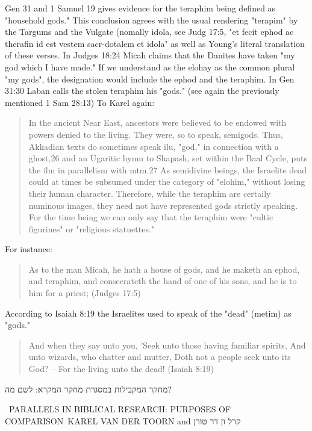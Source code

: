 \documentclass[11pt]{article}
\begin{document}
Gen 31 and 1 Samuel 19 gives evidence for the teraphim being defined as "household gods." This conclusion agrees with the usual rendering "terapim" by the Targums and the Vulgate (nomally idola, see Judg 17:5, "et fecit ephod ac therafin id est vestem sacr-dotalem et idola" as well as Young's literal translation of these verses. In Judges 18:24 Micah claims that the Danites have taken "my god which I have made." If we understand as the elohay as the common plural "my gods", the designation would include the ephod and the teraphim. In Gen 31:30 Laban calls the stolen teraphim his "gods." (see again the previously mentioned 1 Sam 28:13) To Karel again:
\begin{quote}
In the ancient Near East, ancestors were believed to be endowed with powers denied to the living. They were, so to speak, semigods. Thus, Akkadian texts do sometimes speak ilu, "god," in connection with a ghost,26 and an Ugaritic hymn to Shapash, set within the Baal Cycle, puts the ilm in parallelism with mtm.27 As semidivine beings, the Israelite dead could at times be subsumed under the category of "elohim," without losing their human character. Therefore, while the teraphim are certaily numinous images, they need not have represented gods strictly speaking. For the time being we can only say that the teraphim were "cultic figurines" or "religious statuettes."
\end{quote}

For instance:
\begin{quote}
As to the man Micah, he hath a house of gods, and he maketh an ephod, and teraphim, and consecrateth the hand of one of his sons, and he is to him for a priest; (Judges 17:5)
\end{quote}

According to Isaiah 8:19 the Israelites used to speak of the "dead" (metim) as "gods."
\begin{quote}
And when they say unto you, 'Seek unto those having familiar spirits, And unto wizards, who chatter and mutter, Doth not a people seek unto its God? -- For the living unto the dead! (Isaiah 8:19)
\end{quote}



\begin{hebrew}
מחקר המקבילות במסגרת מחקר המקרא: לשם מה?    
\end{hebrew}
 \ PARALLELS IN BIBLICAL RESEARCH: PURPOSES OF COMPARISON\
KAREL VAN DER TOORN and קרל ון דר טורן
\end{document}
